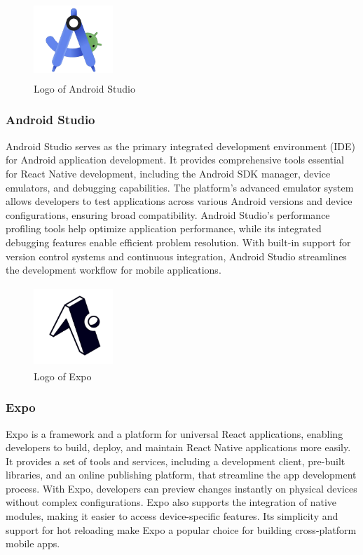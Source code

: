 \documentclass[conference]{IEEEtran}
\begin{document}
        \begin{figure}[htbp]
            \centerline{\includegraphics[width=3cm, height=3cm]{Images/logo/android.png}}
            \caption{Logo of Android Studio}
            \label{fig}
        \end{figure}
        \subsubsection{Android Studio}
            Android Studio serves as the primary integrated development environment (IDE) for Android application development. It provides comprehensive tools essential for React Native development, including the Android SDK manager, device emulators, and debugging capabilities. The platform's advanced emulator system allows developers to test applications across various Android versions and device configurations, ensuring broad compatibility. Android Studio's performance profiling tools help optimize application performance, while its integrated debugging features enable efficient problem resolution. With built-in support for version control systems and continuous integration, Android Studio streamlines the development workflow for mobile applications.

        \begin{figure}[htbp]
            \centerline{\includegraphics[width=3cm, height=3cm]{Images/logo/expo.png}}
            \caption{Logo of Expo}
            \label{fig}
        \end{figure}
        \subsubsection{Expo}
            Expo is a framework and a platform for universal React applications, enabling developers to build, deploy, and maintain React Native applications more easily. It provides a set of tools and services, including a development client, pre-built libraries, and an online publishing platform, that streamline the app development process. With Expo, developers can preview changes instantly on physical devices without complex configurations. Expo also supports the integration of native modules, making it easier to access device-specific features. Its simplicity and support for hot reloading make Expo a popular choice for building cross-platform mobile apps.
\end{document}
